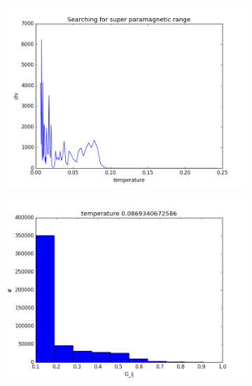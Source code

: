 \documentclass{beamer}
\begin{document}
\begin{frame}[fragile]
\begin{figure}
\begin{subfigure}{0.45\textwidth}
  \includegraphics[width=.8\linewidth]{fig/suspencability.png}
  \caption{}%
  \label{fig:suspenc}
\end{subfigure}
\hspace*{\fill}
\begin{subfigure}{0.45\textwidth}
  \centering
  \includegraphics[width=.8\linewidth]{fig/temp__.png}
  \caption{}%
  \label{fig:gij}
\end{subfigure}
\end{figure}

\end{frame}
\end{document}
